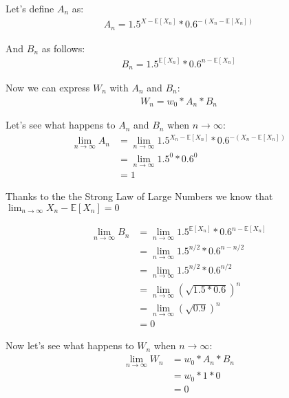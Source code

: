 \documentclass[12pt]{article}
\begin{document}
Let's define $A_n$ as:
\begin{align}
  \begin{equation*}
    A_n = 1.5^{X - \mathbb{E}[X_n]} * 0.6^{-(X_n - \mathbb{E}[X_n])}
  \end{equation*}
\end{align}

And $B_n$ as follows:
\begin{align}
  \begin{equation*}
    B_n = 1.5^{\mathbb{E}[X_n]} * 0.6^{n - \mathbb{E}[X_n]}
  \end{equation*}
\end{align}

Now we can express $W_n$ with $A_n$ and $B_n$:
\begin{align}
  \begin{equation*}
    W_n = w_0 * A_n * B_n
  \end{equation*}
\end{align}

Let's see what happens to $A_n$ and $B_n$ when $n \rightarrow \infty$:
\begin{equation*}
  \begin{split}
    \lim_{n\to\infty} A_n &= \lim_{n\to\infty} 1.5^{X_n - \mathbb{E}[X_n]} * 0.6^{-(X_n - \mathbb{E}[X_n])}\\
    &= \lim_{n\to\infty} 1.5^0 * 0.6^0 \\
    & = 1
  \end{split}
\end{equation*}

Thanks to the the Strong Law of Large Numbers we know that $\lim_{n\to\infty}{X_n - \mathbb{E}[X_n]} = 0$

\begin{equation*}
  \begin{split}
    \lim_{n\to\infty} B_n &=  \lim_{n\to\infty}1.5^{\mathbb{E}[X_n]} * 0.6^{n - \mathbb{E}[X_n]} \\
    &= \lim_{n\to\infty} 1.5^{n/2} * 0.6^{n - n/2} \\
    &= \lim_{n\to\infty} 1.5^{n/2} * 0.6^{n/2} \\
    &= \lim_{n\to\infty} (\sqrt{1.5*0.6})^{n}\\
    &= \lim_{n\to\infty} (\sqrt{0.9}) ^{n}\\
    &= 0
  \end{split}
\end{equation*}

Now let's see what happens to $W_n$ when $n \rightarrow \infty$:
\begin{equation*}
  \begin{split}
    \lim_{n\to\infty} W_n &= w_0 * A_n * B_n\\
    & = w_0 * 1 * 0 \\
    & = 0
  \end{split}
\end{equation*}
  
\end{document}
